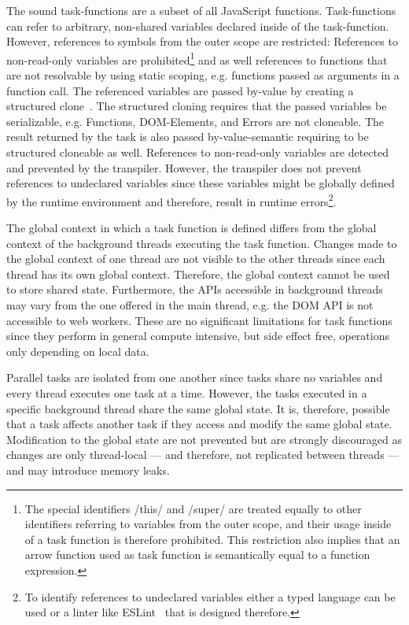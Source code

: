 The sound task-functions are a subset of all JavaScript functions. Task-functions can refer to arbitrary, non-shared variables declared inside of the task-function. However, references to symbols from the outer scope are restricted: References to non-read-only variables are prohibited\footnote{The special identifiers \javascriptinline/this/ and \javascriptinline/super/ are treated equally to other identifiers referring to variables from the outer scope, and their usage inside of a task function is therefore prohibited. This restriction also implies that an arrow function used as task function is semantically equal to a function expression.} and as well references to functions that are not resolvable by using static scoping, e.g. functions passed as arguments in a function call. The referenced variables are passed by-value by creating a structured clone~\cite[Section 2.9.4]{WHATWG2016}. The structured cloning requires that the passed variables be serializable, e.g. Functions, DOM-Elements, and Errors are not cloneable. The result returned by the task is also passed by-value-semantic requiring to be structured cloneable as well. References to non-read-only variables are detected and prevented by the transpiler. However, the transpiler does not prevent references to undeclared variables since these variables might be globally defined by the runtime environment and therefore, result in runtime errors\footnote{To identify references to undeclared variables either a typed language can be used or a linter like ESLint~\cite{eslint} that is designed therefore.}.

The global context in which a task function is defined differs from the global context of the background threads executing the task function. Changes made to the global context of one thread are not visible to the other threads since each thread has its own global context. Therefore, the global context cannot be used to store shared state.  Furthermore, the APIs accessible in background threads may vary from the one offered in the main thread, e.g. the DOM API is not accessible to web workers.  These are no significant limitations for task functions since they perform in general compute intensive, but side effect free, operations only depending on local data.

Parallel tasks are isolated from one another since tasks share no variables and every thread executes one task at a time. However, the tasks executed in a specific background thread share the same global state. It is, therefore, possible that a task affects another task if they access and modify the same global state. Modification to the global state are not prevented but are strongly discouraged as changes are only thread-local --- and therefore, not replicated between threads --- and may introduce memory leaks. 

